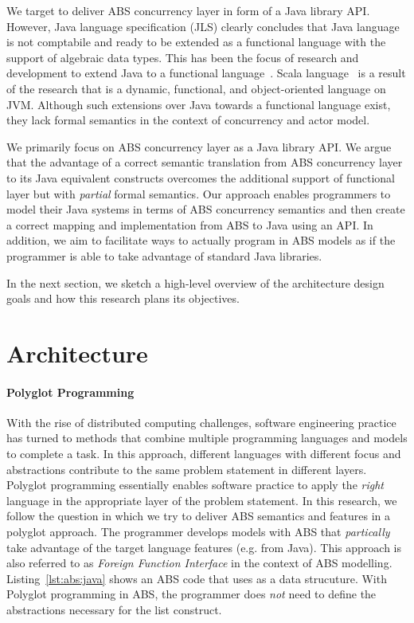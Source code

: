 We target to deliver ABS concurrency layer in form of a Java library API.
However, Java language specification (JLS) clearly concludes that Java language is not comptabile and ready to be extended as a functional language with the support of algebraic data types.
This has been the focus of research and development to extend Java to a functional language~\cite{odersky1997pizza,henkel2003discovering,nystrom2003polyglot,bracha1998making}.
Scala language~\cite{odersky2004scala} is a result of the research that is a dynamic, functional, and object-oriented language on JVM.
Although such extensions over Java towards a functional language exist, they lack formal semantics in the context of concurrency and actor model.

We primarily focus on ABS concurrency layer as a Java library API.
We argue that the advantage of a correct semantic translation from ABS concurrency layer to its Java equivalent constructs overcomes the additional support of functional layer but with \emph{partial} formal semantics.
Our approach enables programmers to model their Java systems in terms of ABS concurrency semantics and then create a correct mapping and implementation from ABS to Java using an API.
In addition, we aim to facilitate ways to actually program in ABS models as if the programmer is able to take advantage of standard Java libraries.

In the next section, we sketch a high-level overview of the architecture design goals and how this research plans its objectives.

\section{Architecture}
\label{sec:intro:arch:crit}

\paragraph{Polyglot Programming}
With the rise of distributed computing challenges, software engineering practice has turned to methods that combine multiple programming languages and models to complete a task. 
In this approach, different languages with different focus and abstractions contribute to the same problem statement in different layers. 
Polyglot programming essentially enables software practice to apply the \emph{right} language in the appropriate layer of the problem statement. 
In this research, we follow the question in which we try to deliver ABS semantics and features in a polyglot approach. 
The programmer develops models with ABS that \emph{partically} take advantage of the target language features (e.g. from Java).
This approach is also referred to as \emph{Foreign Function Interface} in the context of ABS modelling.
Listing~\ref{lst:abs:java} shows an ABS code that uses  as a data strucuture.
With Polyglot programming in ABS, the programmer does \emph{not} need to define the abstractions necessary for the list construct. 


